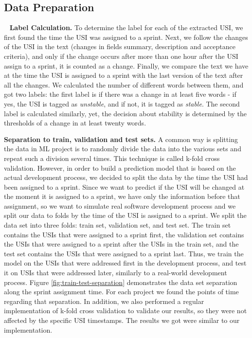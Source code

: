 \subsection{Data Preparation} 
~\newline
\textbf{Label Calculation.} To determine the label for each of the extracted USI, we first found the time the USI was assigned to a sprint. Next, we follow the changes of the USI in the text (changes in fields summary, description and acceptance criteria), and only if the change occurs after more than one hour after the USI assign to a sprint, it is counted as a change. Finally, we compare the text we have at the time the USI is assigned to a sprint with the last version of the text after all the changes. We calculated the number of different words between them, and got two labels:
the first label is if there was a change in at least five words - if yes, the USI is tagged as \emph{unstable}, and if not, it is tagged as  \emph{stable}. The second label is calculated similarly, yet, the decision about stability is determined by the thresholds of a change in at least twenty words.

\textbf{Separation to train, validation and test sets.}
A common way is splitting the data in ML project is to randomly divide the data into the various sets and repeat such a division several times. This technique is called k-fold cross validation. However, in order to build a prediction model that is based on the actual development process, we decided to split the data by the time the USI had been assigned to a sprint. Since we want to predict if the USI will be changed at the moment it is assigned to a sprint, we have only the information before that assignment, so we want to simulate real software development process and we split our data to folds by the time of the USI is assigned to a sprint.
We split the data set into three folds: train set, validation set, and test set.
The train set contains the USIs that were assigned to a sprint first, the validation set contains the USIs that were assigned to a sprint after the USIs in the train set, and the test set contains the USIs that were assigned to a sprint last. Thus, we train the model on the USIs that were addressed first in the development process, and test it on USIs that were addressed later, similarly to a real-world development process. Figure \ref{fig:train-test-separation} demonstrates the data set separation along the sprint assignment time. For each project we found the points of time regarding that separation. %
In addition, we also performed a regular implementation of k-fold cross validation to validate our results, so they were not affected by the specific USI timestamps. The results we got were similar to our implementation.

